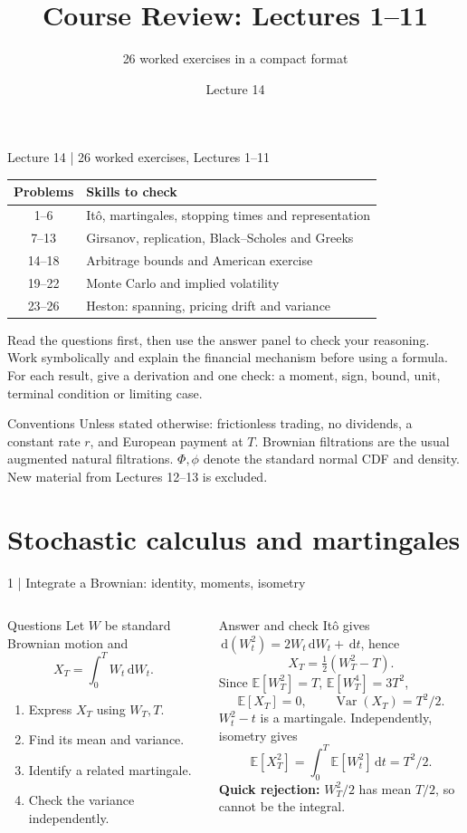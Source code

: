 \documentclass[handout,10pt,t,aspectratio=169]{beamer}
\title{Course Review: Lectures 1--11}
\subtitle{26 worked exercises in a compact format}
\author{}\date{Lecture 14}
\newcommand{\E}{\mathbb E}
\newcommand{\dd}{\,\mathrm d}
\newcommand{\Var}{\operatorname{Var}}
\newenvironment{questions}{\begin{block}{Questions}}{\end{block}}
\newenvironment{answers}{\begin{exampleblock}{Answer and check}}{\end{exampleblock}}
\newcommand{\compact}{\small%
 \setlength{\abovedisplayskip}{3pt}%
 \setlength{\belowdisplayskip}{3pt}%
 \setlength{\abovedisplayshortskip}{2pt}%
 \setlength{\belowdisplayshortskip}{2pt}%
 \setlength{\parskip}{2pt}}
\begin{document}
\begin{frame}{Lecture 14 | 26 worked exercises, Lectures 1--11}
\compact
\begin{center}\begin{tabular}{cl}
\toprule Problems & Skills to check\\\midrule
1--6 & It\^o, martingales, stopping times and representation\\
7--13 & Girsanov, replication, Black--Scholes and Greeks\\
14--18 & Arbitrage bounds and American exercise\\
19--22 & Monte Carlo and implied volatility\\
23--26 & Heston: spanning, pricing drift and variance\\\bottomrule
\end{tabular}\end{center}
Read the questions first, then use the answer panel to check your reasoning.
Work symbolically and explain the financial mechanism before using a formula.
For each result, give a derivation and one check: a moment, sign, bound,
unit, terminal condition or limiting case.
\begin{exampleblock}{Conventions}
Unless stated otherwise: frictionless trading, no dividends, a constant
rate \(r\), and European payment at \(T\). Brownian filtrations are the
usual augmented natural filtrations. \(\Phi,\phi\) denote the standard
normal CDF and density. New material from Lectures 12--13 is excluded.
\end{exampleblock}
\end{frame}


\section{Stochastic calculus and martingales}
\begin{frame}{1 | Integrate a Brownian: identity, moments, isometry}
\compact
\begin{columns}[T,onlytextwidth]
\begin{questions}
Let \(W\) be standard Brownian motion and
\[
 X_T=\int_0^T W_t\dd W_t.
\]
\begin{enumerate}
\item Express \(X_T\) using \(W_T,T\).
\item Find its mean and variance.
\item Identify a related martingale.
\item Check the variance independently.
\end{enumerate}
\end{questions}
\begin{answers}
It\^o gives \(\dd(W_t^2)=2W_t\dd W_t+\dd t\), hence
\[
 \boxed{X_T=\tfrac12(W_T^2-T).}
\]
Since \(\E[W_T^2]=T\), \(\E[W_T^4]=3T^2\),
\[
 \E[X_T]=0,\qquad \Var(X_T)=T^2/2.
\]
\(W_t^2-t\) is a martingale. Independently, isometry gives
\[
 \E[X_T^2]=\int_0^T\E[W_t^2]\dd t=T^2/2.
\]
\textbf{Quick rejection:} \(W_T^2/2\) has mean \(T/2\), so cannot be the integral.
\end{answers}
\end{columns}
\end{frame}
\end{document}
